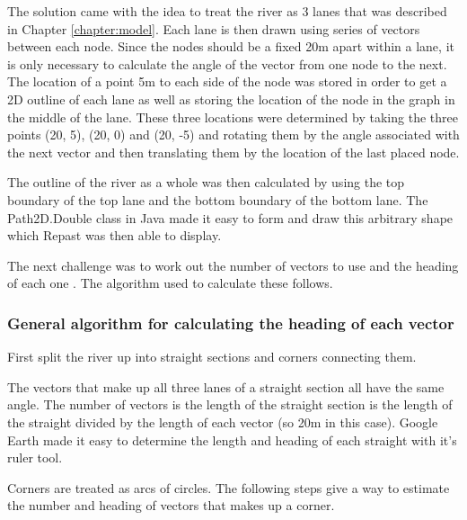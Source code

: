      The solution came with the idea to treat the river as 3 lanes that was described in Chapter \ref{chapter:model}. Each lane is then drawn using series of vectors between each node. Since the nodes should be a fixed 20m apart within a lane, it is only necessary to calculate the angle of the vector from one node to the next. The location of a point 5m to each side of the node was stored in order to get a 2D outline of each lane as well as storing the location of the node in the graph in the middle of the lane. These three locations were determined by taking the three points (20, 5), (20, 0) and (20, -5) and rotating them by the angle associated with the next vector and then translating them by the location of the last placed node. 
      
      The outline of the river as a whole was then calculated by using the top boundary of the top lane and the bottom boundary of the bottom lane. The Path2D.Double class in Java made it easy to form and draw this arbitrary shape which Repast was then able to display. 
      
      The next challenge was to work out the number of vectors to use and the heading of each one . The algorithm used to calculate these follows. 
      
      \subsubsection{General algorithm for calculating the heading of each vector}
      First split the river up into straight sections and corners connecting them. 
      
      The vectors that make up all three lanes of a straight section all have the same angle. The number of vectors is the length of the straight section is the length of the straight divided by the length of each vector (so 20m in this case). Google Earth made it easy to determine the length and heading of each straight with it's ruler tool.
      
      Corners are treated as arcs of circles. The following steps give a way to estimate the number and heading of  vectors that makes up a corner.
      
